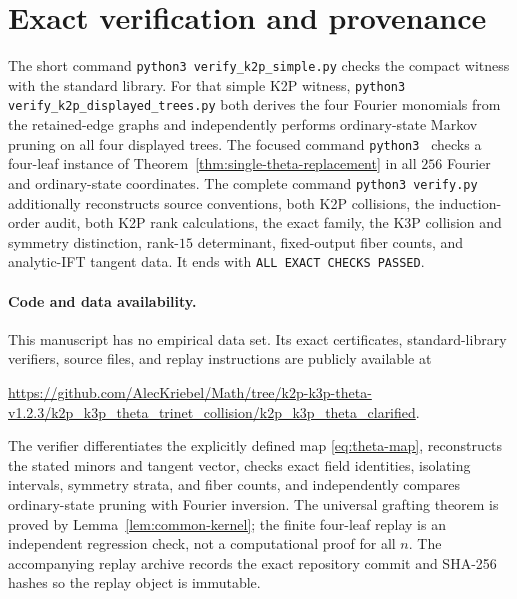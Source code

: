 \documentclass[11pt]{article}
\theoremstyle{remark}\newtheorem{remark}[theorem]{Remark}
\begin{document}
\section{Exact verification and provenance}
The short command \texttt{python3 verify\_k2p\_simple.py} checks the compact witness with the standard library. For that simple K2P witness, \texttt{python3 verify\_k2p\_displayed\_trees.py} both derives the four Fourier monomials from the retained-edge graphs and independently performs ordinary-state Markov pruning on all four displayed trees. The focused command \texttt{python3 } checks a four-leaf instance of Theorem~\ref{thm:single-theta-replacement} in all $256$ Fourier and ordinary-state coordinates. The complete command \texttt{python3 verify.py} additionally reconstructs source conventions, both K2P collisions, the induction-order audit, both K2P rank calculations, the exact family, the K3P collision and symmetry distinction, rank-$15$ determinant, fixed-output fiber counts, and analytic-IFT tangent data. It ends with \texttt{ALL EXACT CHECKS PASSED}.

\paragraph{Code and data availability.}
This manuscript has no empirical data set. Its exact certificates, standard-library verifiers, source files, and replay instructions are publicly available at
\begin{center}
\url{https://github.com/AlecKriebel/Math/tree/k2p-k3p-theta-v1.2.3/k2p_k3p_theta_trinet_collision/k2p_k3p_theta_clarified}.
\end{center}
The verifier differentiates the explicitly defined map \eqref{eq:theta-map}, reconstructs the stated minors and tangent vector, checks exact field identities, isolating intervals, symmetry strata, and fiber counts, and independently compares ordinary-state pruning with Fourier inversion. The universal grafting theorem is proved by Lemma~\ref{lem:common-kernel}; the finite four-leaf replay is an independent regression check, not a computational proof for all $n$. The accompanying replay archive records the exact repository commit and SHA-256 hashes so the replay object is immutable.
\end{document}

